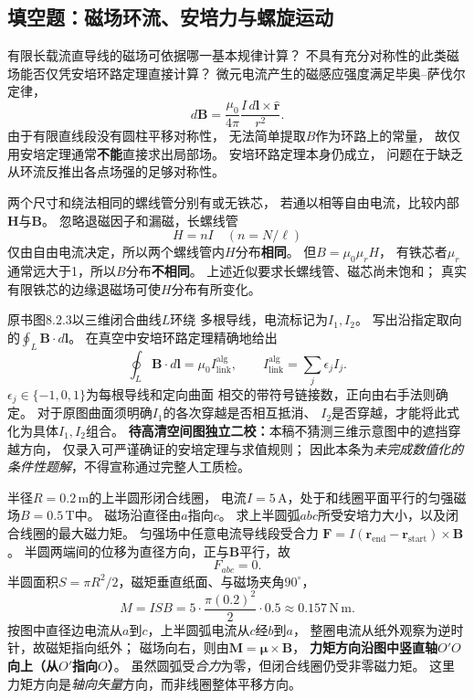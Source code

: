 \subsection{填空题：磁场环流、安培力与螺旋运动}

\problemtext 有限长载流直导线的磁场可依据哪一基本规律计算？
不具有充分对称性的此类磁场能否仅凭安培环路定理直接计算？
\workings
微元电流产生的磁感应强度满足毕奥--萨伐尔定律，
\[
\boxed{d\bm B=\frac{\mu_0}{4\pi}
\frac{I\,d\bm l\times\hat{\bm r}}{r^2}}.
\]
由于有限直线段没有圆柱平移对称性，
无法简单提取$B$作为环路上的常量，
故仅用安培定理通常\textbf{不能}直接求出局部场。
\crosscheck 安培环路定理本身仍成立，
问题在于缺乏从环流反推出各点场强的足够对称性。

\problemtext 两个尺寸和绕法相同的螺线管分别有或无铁芯，
若通以相等自由电流，比较内部$\bm H$与$\bm B$。
\workings
忽略退磁因子和漏磁，长螺线管
\[
\boxed{H=nI}\quad(n=N/\ell)
\]
仅由自由电流决定，所以两个螺线管内$H$分布\textbf{相同}。
但$B=\mu_0\mu_rH$，
有铁芯者$\mu_r$通常远大于1，所以$B$分布\textbf{不相同}。
\crosscheck 上述近似要求长螺线管、磁芯尚未饱和；
真实有限铁芯的边缘退磁场可使$H$分布有所变化。

\problemtext 原书图8.2.3以三维闭合曲线$L$环绕
多根导线，电流标记为$I_1,I_2$。
写出沿指定取向的$\oint_L\bm B\cdot d\bm l$。
\workings
在真空中安培环路定理精确地给出
\[
\boxed{\oint_L\bm B\cdot d\bm l
=\mu_0I_{\mathrm{link}}^{\mathrm{alg}}},\qquad
I_{\mathrm{link}}^{\mathrm{alg}}=\sum_j\epsilon_j I_j.
\]
$\epsilon_j\in\{-1,0,1\}$为每根导线和定向曲面
相交的带符号链接数，正向由右手法则确定。
对于原图曲面须明确$I_1$的各次穿越是否相互抵消、
$I_2$是否穿越，才能将此式化为具体$I_1,I_2$组合。
\crosscheck \textbf{待高清空间图独立二校：}本稿不猜测三维示意图中的遮挡穿越方向，
仅录入可严谨确证的安培定理与求值规则；
因此本条为\emph{未完成数值化的条件性题解}，不得宣称通过完整人工质检。

\problemtext 半径$R=0.2\,\mathrm m$的上半圆形闭合线圈，
电流$I=5\,\mathrm A$，处于和线圈平面平行的匀强磁场$B=0.5\,\mathrm T$中。
磁场沿直径由$a$指向$c$。
求上半圆弧$abc$所受安培力大小，以及闭合线圈的最大磁力矩。
\workings
匀强场中任意电流导线段受合力
$\bm F=I(\bm r_{\mathrm{end}}-\bm r_{\mathrm{start}})\times\bm B$。
半圆两端间的位移为直径方向，正与$\bm B$平行，故
\[
\boxed{F_{abc}=0}.
\]
半圆面积$S=\pi R^2/2$，磁矩垂直纸面、与磁场夹角$90^\circ$，
\[
\boxed{M=ISB
=5\cdot\frac{\pi(0.2)^2}{2}\cdot0.5
\approx0.157\,\mathrm{N\,m}}.
\]
按图中直径边电流从$a$到$c$，上半圆弧电流从$c$经$b$到$a$，
整圈电流从纸外观察为逆时针，故磁矩指向纸外；
磁场向右，则由$\bm M=\bm\mu\times\bm B$，
\textbf{力矩方向沿图中竖直轴$O'O$向上（从$O'$指向$O$）}。
\crosscheck 虽然圆弧受\emph{合力}为零，但闭合线圈仍受非零磁力矩。
这里力矩方向是\emph{轴向矢量}方向，而非线圈整体平移方向。

